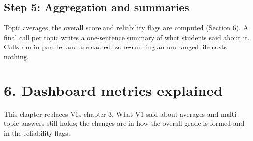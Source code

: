 \documentclass[
  11pt,
]{article}
\begin{document}
\subsection{Step 5: Aggregation and
summaries}\label{step-5-aggregation-and-summaries}

Topic averages, the overall score and reliability flags are computed (Section
6). A final call per topic writes a one-sentence summary of what students said
about it. Calls run in parallel and are cached, so re-running an unchanged file
costs nothing.

\section{6. Dashboard metrics explained}\label{6-dashboard-metrics-explained}

This chapter replaces V1\textquotesingle s chapter 3. What V1 said about
averages and multi-topic answers still holds; the changes are in how the overall
grade is formed and in the reliability flags.
\end{document}
